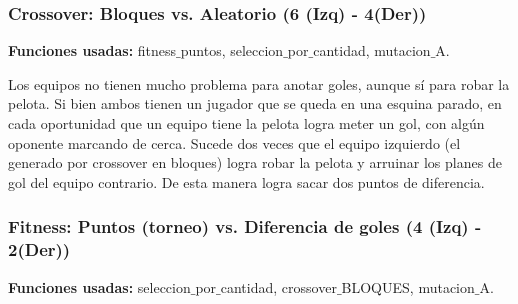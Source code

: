 



\subsubsection*{Crossover: Bloques vs. Aleatorio (6 (Izq) - 4(Der))}

\textbf{Funciones usadas: } fitness$\_$puntos, seleccion$\_$por$\_$cantidad, mutacion$\_$A.






Los equipos no tienen mucho problema para anotar goles, aunque sí para robar la pelota.
Si bien ambos tienen un jugador que se queda en una esquina parado, en cada oportunidad que un equipo tiene la pelota logra meter un gol, con algún oponente marcando de cerca.
Sucede dos veces que el equipo izquierdo (el generado por crossover en bloques) logra robar la pelota y arruinar los planes de gol del equipo contrario. De esta manera logra sacar dos puntos de diferencia.


\subsubsection*{Fitness: Puntos (torneo) vs. Diferencia de goles (4 (Izq) - 2(Der))}

\textbf{Funciones usadas: } seleccion$\_$por$\_$cantidad, crossover$\_$BLOQUES, mutacion$\_$A.


